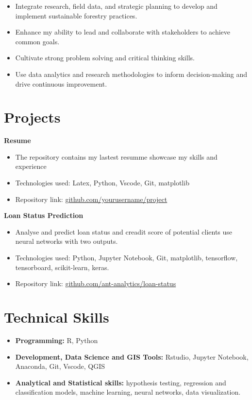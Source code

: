 \documentclass[a4paper,12pt]{article}
\begin{document}
\vspace{-1.5em} %
\begin{itemize}
    \item Integrate research, field data, and strategic planning to develop and implement sustainable forestry practices.
    \item Enhance my ability to lead and collaborate with stakeholders to achieve common goals.
    \item Cultivate strong problem solving and critical thinking skills.
    \item Use data analytics and research methodologies to inform decision-making and drive continuous improvement.
\end{itemize}

\section*{Projects}
\noindent
\textbf{Resume} \newline
\vspace{-1.5em} %
\begin{itemize}
    \item The repository contains my lastest resumme showcase my skills and experience
    \item Technologies used: Latex, Python, Vscode, Git, matplotlib
    \item Repository link: \href{https://github.com/yourusername/project}{github.com/yourusername/project} 
\end{itemize}
\noindent
\textbf{Loan Status Prediction}  \newline
\vspace{-1.5em} %
\begin{itemize}
    \item Analyse and predict loan status and creadit score of potential clients use neural networks with two outputs.
    \item Technologies used: Python, Jupyter Notebook, Git, matplotlib, tensorflow, tensorboard, scikit-learn, keras.
    \item Repository link: \href{https://github.com/ant-analytics/loan-status.git}{github.com/ant-analytics/loan-status}
\end{itemize}

\section*{Technical Skills}
\begin{itemize}
    \item \textbf{Programming:} R, Python
    \item \textbf{Development, Data Science and GIS Tools:} Rstudio, Jupyter Notebook, Anaconda, Git, Vscode, QGIS
    \item \textbf{Analytical and Statistical skills:} hypothesis testing, regression and classification models, machine learning, neural networks, data visualization.
\end{itemize}
\end{document}

